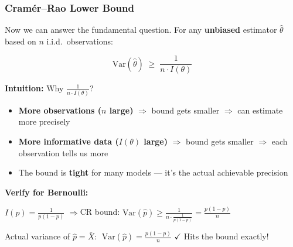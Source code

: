 \documentclass[aspectratio=169]{beamer}
\begin{document}
\begin{frame}
\frametitle{Cram\'er--Rao Lower Bound}

\small
Now we can answer the fundamental question. For any \textbf{unbiased} estimator $\hat\theta$ based on $n$ i.i.d.\ observations:

$$\boxed{\text{Var}(\hat\theta) \;\geq\; \frac{1}{n \cdot I(\theta)}}$$

\vspace{0.1cm}
\textbf{Intuition:} Why $\frac{1}{n \cdot I(\theta)}$?
\begin{itemize}\setlength{\itemsep}{3pt}
  \item \textbf{More observations ($n$ large)} $\Rightarrow$ bound gets smaller $\Rightarrow$ can estimate more precisely
  \item \textbf{More informative data ($I(\theta)$ large)} $\Rightarrow$ bound gets smaller $\Rightarrow$ each observation tells us more
  \item The bound is \textbf{tight} for many models --- it's the actual achievable precision
\end{itemize}

\pause
\vspace{0.15cm}
\textbf{Verify for Bernoulli:}

\vspace{-0.1cm}
\begin{center}
\small
$I(p) = \frac{1}{p(1-p)}$ \quad$\Rightarrow$\quad CR bound: $\text{Var}(\hat{p}) \geq \frac{1}{n \cdot \frac{1}{p(1-p)}} = \frac{p(1-p)}{n}$

\vspace{0.1cm}
Actual variance of $\hat{p} = \bar{X}$: $\;\text{Var}(\hat{p}) = \frac{p(1-p)}{n}$ \;\;\textcolor{paramgreen}{$\checkmark$ Hits the bound exactly!}
\end{center}
\end{frame}
\end{document}
